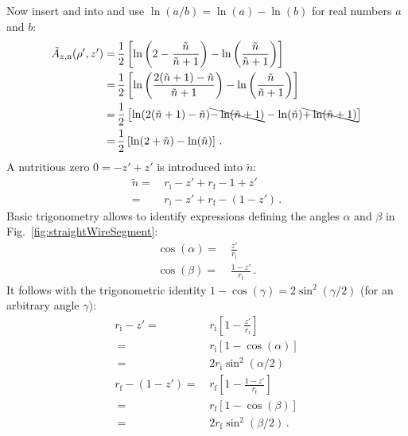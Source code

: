 Now insert  and  into 
and use $\ln(a/b) = \ln(a) - \ln(b)$ for real numbers $a$ and $b$:
\begin{align}
  \tilde{A}_{z,\mathrm{n}} (\rho', z')
  =&\, \frac{1}{2} \left[ \ln \left( 2 - \frac{\tilde{n}}{\tilde{n}+1} \right) - \ln \left( \frac{\tilde{n}}{\tilde{n}+1} \right) \right] \nonumber \\
  =&\, \frac{1}{2} \left[ \ln \left( \frac{2(\tilde{n}+1) - \tilde{n}}{\tilde{n}+1} \right) - \ln \left( \frac{\tilde{n}}{\tilde{n}+1} \right) \right] \nonumber \\
  =&\, \frac{1}{2} \left[ \ln (2(\tilde{n}+1) - \tilde{n}) \bcancel{- \ln(\tilde{n}+1)} - \ln (\tilde{n}) \bcancel{+ \ln(\tilde{n}+1)} \right]  \nonumber \\
  =&\, \frac{1}{2} \left[ \ln (2 + \tilde{n}) - \ln (\tilde{n}) \right] \label{eqn:sws_A_z_n_withfac2} \, .
\end{align}
A nutritious zero $0 = -z' + z'$ is introduced into $\tilde{n}$:
\begin{align}
  \tilde{n} =&\, r_\mathrm{i} - z' + r_\mathrm{f} - 1 + z' \nonumber \\
    =&\, r_\mathrm{i} - z' + r_\mathrm{f} - (1 - z') \label{eqn:ndef} \, .
\end{align}
Basic trigonometry allows to identify expressions defining the angles $\alpha$ and $\beta$ in Fig.~\ref{fig:straightWireSegment}:
\begin{align}
  \cos(\alpha) =&\, \frac{    z'}{r_\mathrm{i}} \label{eqn:cos_alpha} \\
  \cos(\beta ) =&\, \frac{1 - z'}{r_\mathrm{f}} \label{eqn:cos_beta} \, .
\end{align}
It follows with the trigonometric identity $1 - \cos(\gamma) = 2 \sin^2(\gamma/2)$ (for an arbitrary angle $\gamma$):
\begin{align}
  r_\mathrm{i} -      z'  =&\, r_\mathrm{i} \left[ 1 - \frac{z'}{r_\mathrm{i}} \right] \nonumber \\
       ~                  =&\, r_\mathrm{i} \left[ 1 - \cos(\alpha) \right] \nonumber \\
       ~                  =&\, 2 r_\mathrm{i} \sin^2(\alpha/2) \label{eqn:riz} \\
  r_\mathrm{f} - (1 - z') =&\, r_\mathrm{f} \left[ 1 - \frac{1 - z'}{r_\mathrm{f}} \right] \nonumber \\
       ~            =&\, r_\mathrm{f} \left[ 1 - \cos(\beta) \right] \nonumber \\
       ~            =&\, 2 r_\mathrm{f} \sin^2(\beta/2) \label{eqn:rfomz} \, .
\end{align}

